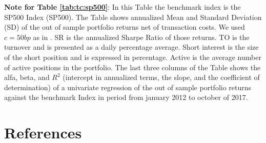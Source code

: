 \documentclass[preprint, doubleblind, authoryear,10pt]{elsarticle}
\begin{document}
\begin{singlespace}
{\footnotesize
\textbf{Note for Table \ref{tab:tc:sp500}}:
In this Table the benchmark index is the SP500 Index (SP500).
The Table shows annualized Mean and Standard Deviation (SD) of the out of sample portfolio returns net of transaction costs.
We used $c=50bp$ as in \cite{dgu2009}.
SR is the annualized Sharpe Ratio of those returns.
TO is the turnover and is presented as a daily percentage average.
Short interest is the size of the short position and is expressed in percentage.
Active is the average number of active positions in the portfolio.
The last three columns of the Table shows the alfa, beta, and $R^2$ (intercept in annualized terms, the slope, and the coefficient of determination) of a univariate regression of the out of sample portfolio returns against the benchmark Index in period from january 2012 to october of 2017.}
\end{singlespace}

\clearpage
\section*{References}

\end{document}
